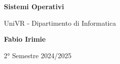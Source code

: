 \begin{titlepage}
	\begin{center}
		\vspace*{1cm}

		\Huge
		\textbf{Sistemi Operativi}

		\vspace{0.5cm}
		\LARGE
		UniVR - Dipartimento di Informatica

		\vspace{1.5cm}

		\textbf{Fabio Irimie}

		\vfill


		\vspace{0.8cm}


		2° Semestre 2024/2025

	\end{center}
\end{titlepage}
